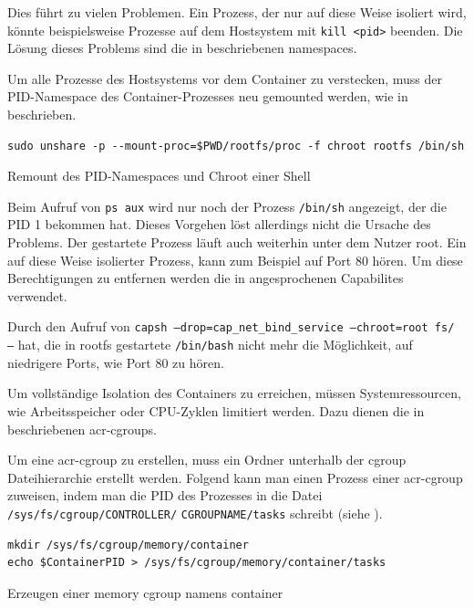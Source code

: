 Dies führt zu vielen Problemen. Ein Prozess, der nur auf diese Weise isoliert wird, könnte beispielsweise Prozesse auf dem Hostsystem mit \texttt{kill <pid>} beenden. Die Lösung dieses Problems sind die in  beschriebenen namespaces.

Um alle Prozesse des Hostsystems vor dem Container zu verstecken, muss der PID-Namespace des Container-Prozesses neu gemounted werden, wie in  beschrieben.
\begin{listing}[h]
	\begin{verbatim}
sudo unshare -p --mount-proc=$PWD/rootfs/proc -f chroot rootfs /bin/sh
	\end{verbatim}
	\caption{Remount des PID-Namespaces und Chroot einer Shell}
	\label{lst:unshareRemount}
\end{listing}

Beim Aufruf von \glqq \texttt{ps aux}\grqq{} wird nur noch der Prozess \texttt{/bin/sh} angezeigt, der die PID 1 bekommen hat. Dieses Vorgehen löst allerdings nicht die Ursache des Problems. Der gestartete Prozess läuft auch weiterhin unter dem Nutzer root. Ein auf diese Weise isolierter Prozess, kann zum Beispiel auf Port 80 hören. Um diese Berechtigungen zu entfernen werden die in  angesprochenen Capabilites verwendet.

Durch den Aufruf von \texttt{capsh --drop=cap_net_bind_service --chroot=root fs/ --} hat, die in rootfs gestartete \texttt{/bin/bash} nicht mehr die Möglichkeit, auf niedrigere Ports, wie Port 80 zu hören.


Um vollständige Isolation des Containers zu erreichen, müssen Systemressourcen, wie Arbeitsspeicher oder CPU-Zyklen limitiert werden. Dazu dienen die in  beschriebenen \glspl{acr-cgroup}.

Um eine \gls{acr-cgroup} zu erstellen, muss ein Ordner unterhalb der cgroup Dateihierarchie erstellt werden. Folgend kann man einen Prozess einer \gls{acr-cgroup} zuweisen, indem man die PID des Prozesses in die Datei \texttt{/sys/fs/cgroup/CONTROLLER/} \texttt{CGROUPNAME/tasks} schreibt (siehe ).

\begin{listing}[h]
	\begin{verbatim}
mkdir /sys/fs/cgroup/memory/container
echo $ContainerPID > /sys/fs/cgroup/memory/container/tasks
	\end{verbatim}
	\caption{Erzeugen einer memory cgroup namens container}
	\label{lst:cgroupZuweisen}
\end{listing}


